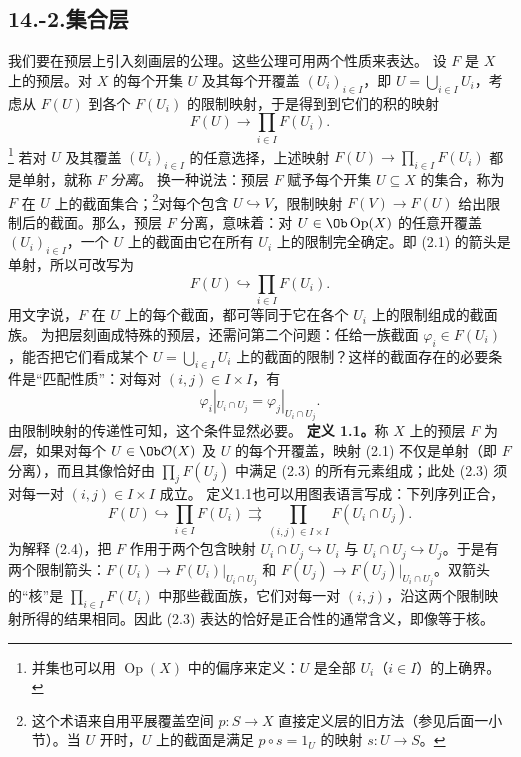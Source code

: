 \subsection*{14.-2.\quad 集合层}
我们要在预层上引入刻画层的公理。这些公理可用两个性质来表达。
设 $F$ 是 $X$ 上的预层。对 $X$ 的每个开集 $U$ 及其每个开覆盖 $(U_i)_{i\in I}$，即 $U=\bigcup_{i\in I}U_i$，考虑从 $F(U)$ 到各个 $F(U_i)$ 的限制映射，于是得到到它们的积的映射
\begin{equation}\tag{2.1}
 F(U)\longrightarrow\prod_{i\in I}F(U_i).
\end{equation}
\footnote{并集也可以用 $\operatorname{Op}(X)$ 中的偏序来定义：$U$ 是全部 $U_i$（$i\in I$）的上确界。}
若对 $U$ 及其覆盖 $(U_i)_{i\in I}$ 的任意选择，上述映射 $F(U)\to\prod_{i\in I}F(U_i)$ 都是单射，就称 $F$ \emph{分离}。
换一种说法：预层 $F$ 赋予每个开集 $U\subseteq X$ 的集合，称为 $F$ 在 $U$ 上的截面集合；\footnote{这个术语来自用平展覆盖空间 $p\colon S\to X$ 直接定义层的旧方法（参见后面一小节）。当 $U$ 开时，$U$ 上的截面是满足 $p\circ s=1_U$ 的映射 $s\colon U\to S$。}对每个包含 $U\hookrightarrow V$，限制映射 $F(V)\to F(U)$ 给出限制后的截面。那么，预层 $F$ 分离，意味着：对 $U\in\Ob\operatorname{Op}(X)$ 的任意开覆盖 $(U_i)_{i\in I}$，一个 $U$ 上的截面由它在所有 $U_i$ 上的限制完全确定。即 (2.1) 的箭头是单射，所以可改写为
\begin{equation}\tag{2.2}
 F(U)\hookrightarrow\prod_{i\in I}F(U_i).
\end{equation}
用文字说，$F$ 在 $U$ 上的每个截面，都可等同于它在各个 $U_i$ 上的限制组成的截面族。
为把层刻画成特殊的预层，还需问第二个问题：任给一族截面 $\varphi_i\in F(U_i)$，能否把它们看成某个 $U=\bigcup_{i\in I}U_i$ 上的截面的限制？这样的截面存在的必要条件是“匹配性质”：对每对 $(i,j)\in I\times I$，有
\begin{equation}\tag{2.3}
 \varphi_i|_{U_i\cap U_j}=\varphi_j|_{U_i\cap U_j}.
\end{equation}
由限制映射的传递性可知，这个条件显然必要。
\textbf{定义 1.1。}称 $X$ 上的预层 $F$ 为\emph{层}，如果对每个 $U\in\Ob\mathcal O(X)$ 及 $U$ 的每个开覆盖，映射 (2.1) 不仅是单射（即 $F$ 分离），而且其像恰好由 $\prod_jF(U_j)$ 中满足 (2.3) 的所有元素组成；此处 (2.3) 须对每一对 $(i,j)\in I\times I$ 成立。
定义1.1也可以用图表语言写成：下列序列正合，
\begin{equation}\tag{2.4}
 F(U)\hookrightarrow\prod_{i\in I}F(U_i)
 \rightrightarrows\prod_{(i,j)\in I\times I}F(U_i\cap U_j).
\end{equation}
为解释 (2.4)，把 $F$ 作用于两个包含映射 $U_i\cap U_j\hookrightarrow U_i$ 与 $U_i\cap U_j\hookrightarrow U_j$。于是有两个限制箭头：$F(U_i)\to F(U_i)|_{U_i\cap U_j}$ 和 $F(U_j)\to F(U_j)|_{U_i\cap U_j}$。双箭头的“核”是 $\prod_{i\in I}F(U_i)$ 中那些截面族，它们对每一对 $(i,j)$，沿这两个限制映射所得的结果相同。因此 (2.3) 表达的恰好是正合性的通常含义，即像等于核。
